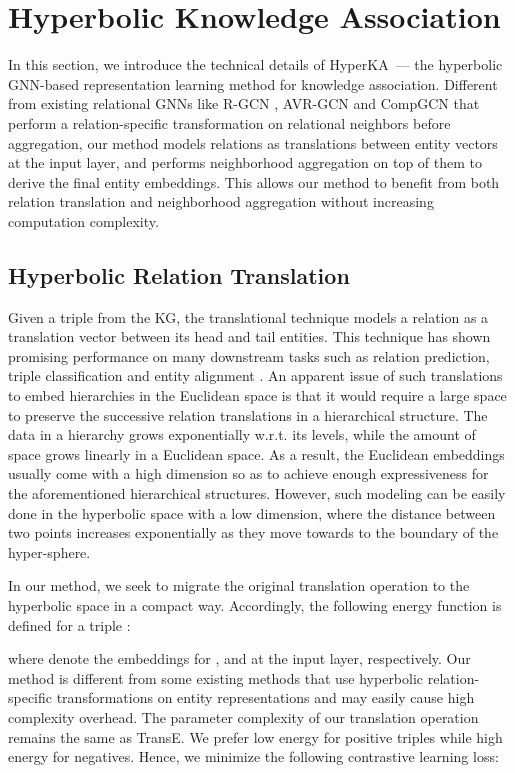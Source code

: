 \documentclass[11pt,a4paper]{article}
\newcommand{\modelname}{HyperKA\xspace}
\begin{document}
 \section{Hyperbolic Knowledge Association}
In this section, we introduce the technical details of \modelname\ --- the hyperbolic GNN-based representation learning method for knowledge association. Different from existing relational GNNs like R-GCN \cite{R-GCN}, AVR-GCN \cite{AVR-GCN} and CompGCN \cite{CompGCN} that perform a relation-specific transformation on relational neighbors before aggregation, our method models relations as translations between entity vectors at the input layer, and performs neighborhood aggregation on top of them to derive the final entity embeddings. This allows our method to benefit from both relation translation and neighborhood aggregation without increasing computation complexity.

\subsection{Hyperbolic Relation Translation}
\label{sect:translation}
Given a triple from the KG, the translational technique \cite{TransE} models a relation as a translation vector between its head and tail entities. This technique has shown promising performance on many downstream tasks such as relation prediction, triple classification and entity alignment \cite{TransE,MTransE,TransEdge}. An apparent issue of such translations to embed hierarchies in the Euclidean space is that it would require a large space to preserve the successive relation translations in a hierarchical structure. The data in a hierarchy grows exponentially w.r.t. its levels, while the amount of space grows linearly in a Euclidean space. As a result, the Euclidean embeddings usually come with a high dimension so as to achieve enough expressiveness for the aforementioned hierarchical structures. However, such modeling can be easily done in the hyperbolic space with a low dimension, where the distance between two points increases exponentially as they move towards to the boundary of the hyper-sphere. 

In our method, we seek to migrate the original translation operation to the hyperbolic space in a compact way. Accordingly, the following energy function is defined for a triple :

where  denote the embeddings for ,  and  at the input layer, respectively. Our method is different from some existing methods \cite{PoincareKG,HyperKG} that use hyperbolic relation-specific transformations on entity representations and may easily cause high complexity overhead. The parameter complexity of our translation operation remains the same as TransE. We prefer low energy for positive triples while high energy for negatives. Hence, we minimize the following contrastive learning loss:
\end{document}
